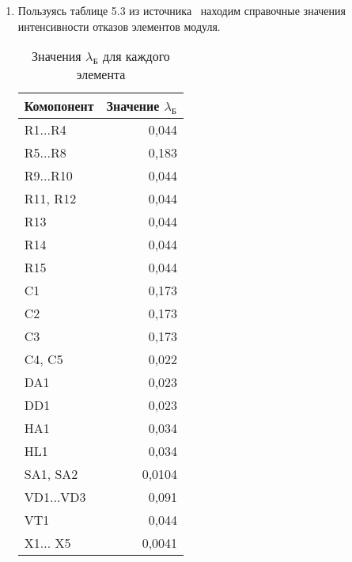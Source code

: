 \begin{enumerate}
\item Пользуясь таблице 5.3 из источника~\cite{Borovikov2010} находим
  справочные значения интенсивности отказов элементов модуля.
  \begin{table}[H]
    \centering
        \caption{Значения $\lambda_{\textrm{Б}}$ для каждого элемента}
    \begin{tabular}{|l|r|}
      \hline
      Комопонент & Значение $\lambda_{\textrm{Б}}$ \\ \hline
      R1...R4 & 0,044 \\ \hline
      R5...R8 & 0,183 \\ \hline
      R9...R10 & 0,044 \\ \hline
      R11, R12 & 0,044 \\ \hline
      R13 & 0,044 \\ \hline
      R14 & 0,044 \\ \hline
      R15 & 0,044 \\ \hline
      C1 & 0,173 \\ \hline
      C2 & 0,173 \\ \hline
      C3 & 0,173 \\ \hline
      C4, C5 & 0,022 \\ \hline
      DA1 & 0,023 \\ \hline
      DD1 & 0,023 \\ \hline
      HA1 & 0,034 \\ \hline
      HL1 & 0,034 \\ \hline
      SA1, SA2 & 0,0104 \\ \hline
      VD1...VD3 & 0,091 \\ \hline
      VT1 & 0,044 \\ \hline
      X1... X5 & 0,0041 \\ \hline
    \end{tabular}
  \end{table}
\end{enumerate}
\newpage

